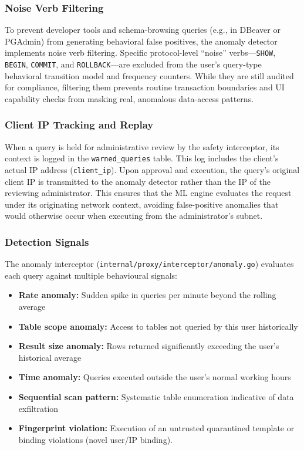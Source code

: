 \subsubsection{Noise Verb Filtering}

To prevent developer tools and schema-browsing queries (e.g., in DBeaver or PGAdmin) from generating behavioral false positives, the anomaly detector implements noise verb filtering. Specific protocol-level ``noise'' verbs---\texttt{SHOW}, \texttt{BEGIN}, \texttt{COMMIT}, and \texttt{ROLLBACK}---are excluded from the user's query-type behavioral transition model and frequency counters. While they are still audited for compliance, filtering them prevents routine transaction boundaries and UI capability checks from masking real, anomalous data-access patterns.

\subsubsection{Client IP Tracking and Replay}

When a query is held for administrative review by the safety interceptor, its context is logged in the \texttt{warned\_queries} table. This log includes the client's actual IP address (\texttt{client\_ip}). Upon approval and execution, the query's original client IP is transmitted to the anomaly detector rather than the IP of the reviewing administrator. This ensures that the ML engine evaluates the request under its originating network context, avoiding false-positive anomalies that would otherwise occur when executing from the administrator's subnet.

\subsubsection{Detection Signals}

The anomaly interceptor (\texttt{internal/proxy/interceptor/anomaly.go}) evaluates each query against multiple behavioural signals:

\begin{itemize}[leftmargin=*]
    \item \textbf{Rate anomaly:} Sudden spike in queries per minute beyond the rolling average
    \item \textbf{Table scope anomaly:} Access to tables not queried by this user historically
    \item \textbf{Result size anomaly:} Rows returned significantly exceeding the user's historical average
    \item \textbf{Time anomaly:} Queries executed outside the user's normal working hours
    \item \textbf{Sequential scan pattern:} Systematic table enumeration indicative of data exfiltration
    \item \textbf{Fingerprint violation:} Execution of an untrusted quarantined template or binding violations (novel user/IP binding).
\end{itemize}

